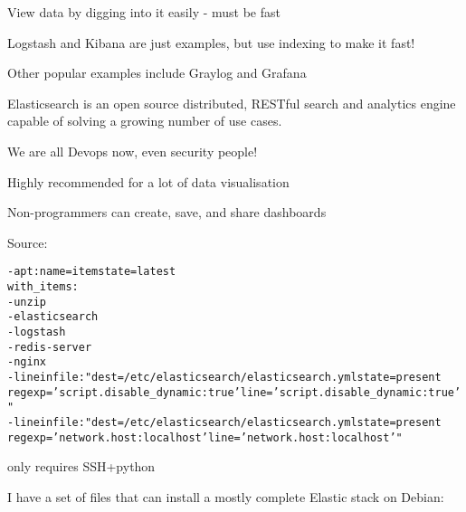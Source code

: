 \documentclass[Screen16to9,17pt]{foils}
\begin{document}


\begin{list1}
\item View data by digging into it easily - must be fast
\item Logstash and Kibana are just examples, but use indexing to make it fast!
\item Other popular examples include Graylog and Grafana
\end{list1}



Elasticsearch is an open source distributed, RESTful search and analytics engine capable of solving a growing number of use cases.


\vskip 1cm
\centerline{We are all Devops now, even security people!}




\centerline{Highly recommended for a lot of data visualisation}

Non-programmers can create, save, and share dashboards

Source:




\begin{alltt}\small
- apt: name={{ item }} state=latest
  with_items:
        - unzip
        - elasticsearch
        - logstash
        - redis-server
        - nginx
- lineinfile: "dest=/etc/elasticsearch/elasticsearch.yml state=present
  regexp='script.disable_dynamic: true' line='script.disable_dynamic: true'"
- lineinfile: "dest=/etc/elasticsearch/elasticsearch.yml state=present
  regexp='network.host: localhost' line='network.host: localhost'"
\end{alltt}
\vskip 5mm
\centerline{only requires SSH+python }

I have a set of files that can install a mostly complete Elastic stack on Debian:\\
\end{document}
